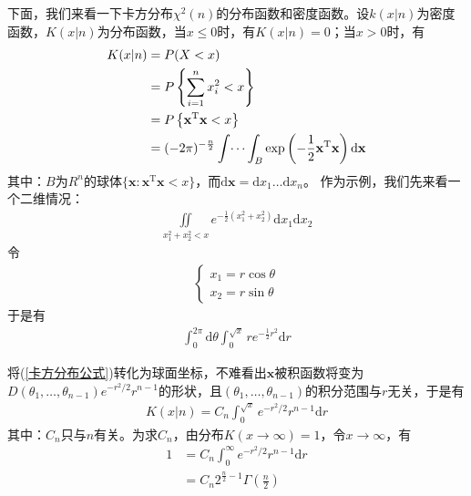         \par
        下面，我们来看一下卡方分布$\chi^2(n)$的分布函数和密度函数。设$k(x|n)$为密度函数，$K(x|n)$为分布函数，当$x \leqslant 0$时，有$K(x|n) = 0$；当$x>0$时，有
        \begin{align}
        \label{卡方分布公式}
        K(x|n) &= P(X<x) \notag \\
        &= P\left\{\sum_{i =1}^n x_i^2<x\right\} \notag \\
        &=P\left\{ \mathbf{x}^\mathrm{T}\mathbf{x}<x \right\}\notag \\
        &=(-2\pi)^{-\frac{n}{2}}\int\dots\int_B\exp \left( -\frac 12 \mathbf{x}^\mathrm{T}\mathbf{x} \right) \mathrm{d}\mathbf{x}
        \end{align}
        其中：$B$为$R^n$的球体$\{\mathbf{x}:\mathbf{x}^\mathrm{T}\mathbf{x}<x\}$，而$\mathrm{d}\mathbf{x} = \mathrm{d}x_1\dots\mathrm{d}x_n$。
        作为示例，我们先来看一个二维情况：
        \begin{align*}
        \iint\limits_{x_1^2+x_2^2<x} e^{-\frac 12 (x_1^2+x_2^2)}\mathrm{d}x_1\mathrm{d}x_2
        \end{align*}
        令
        \begin{align*}
        \left\{
        \begin{aligned}
        x_1= r\cos \theta\\
        x_2 = r\sin\theta
        \end{aligned}
        \right.
        \end{align*}
        于是有
        \begin{align*}
        \int_0^{2\pi}\mathrm{d}\theta\int_0^{\sqrt{x}} r e^{-\frac 12 r^2}\mathrm{d}r
        \end{align*}
        \par
        将(\ref{卡方分布公式})转化为球面坐标，不难看出$\mathbf{x}$被积函数将变为$D(\theta_1,\dots,\theta_{n-1})e^{-r^2/2}r^{n-1}$的形状，且$(\theta_1,\dots,\theta_{n-1})$的积分范围与$r$无关，于是有
        \begin{align*}
        K(x|n) = C_n \int_0^{\sqrt{x}}e^{-r^2/2}r^{n-1}\mathrm{d}r
        \end{align*}
        其中：$C_n$只与$n$有关。为求$C_n$，由分布$K(x\rightarrow \infty) =1$，令$x\rightarrow \infty$，有
        \begin{align*}
        1 &= C_n\int_0^\infty e^{-r^2/2}r^{n-1}\mathrm{d}r \\
        &= C_n2^{\frac{n}{2}-1}\Gamma \left( \frac{n}{2} \right)
        \end{align*}
